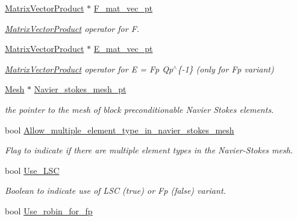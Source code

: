 \begin{DoxyCompactItemize}
\hyperlink{classoomph_1_1MatrixVectorProduct}{Matrix\+Vector\+Product} $\ast$ \hyperlink{classoomph_1_1NavierStokesSchurComplementPreconditioner_a66a5925f3bd0642de7bd3e61b8d740dc}{F\+\_\+mat\+\_\+vec\+\_\+pt}
\begin{DoxyCompactList}\small\item\em \hyperlink{classoomph_1_1MatrixVectorProduct}{Matrix\+Vector\+Product} operator for F. \end{DoxyCompactList}\item 
\hyperlink{classoomph_1_1MatrixVectorProduct}{Matrix\+Vector\+Product} $\ast$ \hyperlink{classoomph_1_1NavierStokesSchurComplementPreconditioner_a6a02950e86b2b8a092dda57587850d1c}{E\+\_\+mat\+\_\+vec\+\_\+pt}
\begin{DoxyCompactList}\small\item\em \hyperlink{classoomph_1_1MatrixVectorProduct}{Matrix\+Vector\+Product} operator for E = Fp Qp$^\wedge$\{-\/1\} (only for Fp variant) \end{DoxyCompactList}\item 
\hyperlink{classoomph_1_1Mesh}{Mesh} $\ast$ \hyperlink{classoomph_1_1NavierStokesSchurComplementPreconditioner_a6153711f9561d3d617b78d3035147326}{Navier\+\_\+stokes\+\_\+mesh\+\_\+pt}
\begin{DoxyCompactList}\small\item\em the pointer to the mesh of block preconditionable Navier Stokes elements. \end{DoxyCompactList}\item 
bool \hyperlink{classoomph_1_1NavierStokesSchurComplementPreconditioner_a932ce8737a185ca987a2c75d8af360d9}{Allow\+\_\+multiple\+\_\+element\+\_\+type\+\_\+in\+\_\+navier\+\_\+stokes\+\_\+mesh}
\begin{DoxyCompactList}\small\item\em Flag to indicate if there are multiple element types in the Navier-\/\+Stokes mesh. \end{DoxyCompactList}\item 
bool \hyperlink{classoomph_1_1NavierStokesSchurComplementPreconditioner_a6c6abbfacbceba68be65855cc32bccb1}{Use\+\_\+\+L\+SC}
\begin{DoxyCompactList}\small\item\em Boolean to indicate use of L\+SC (true) or Fp (false) variant. \end{DoxyCompactList}\item 
bool \hyperlink{classoomph_1_1NavierStokesSchurComplementPreconditioner_a3aa99e654544365b78d4dca057ed53e0}{Use\+\_\+robin\+\_\+for\+\_\+fp}

\end{DoxyCompactItemize}
